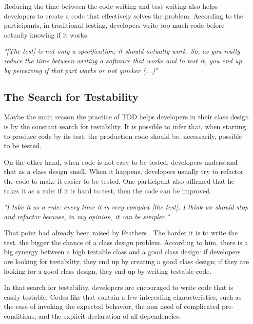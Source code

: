 \documentclass[times]{elsarticle}
\begin{document}
Reducing the time between the code writing and test writing also helps developers to
create a code that effectively solves the problem. According to the participants, in traditional
testing, developers write too much code before actually knowing if it works:

\begin{framed}
	\textit{"[The test] is not only a specification; it should actually work. So, as you really reduce
	the time between writing a software that works and to test it, you end up by perceiving if that
	part works or not quicker (...)"}
\end{framed}

\subsection{The Search for Testability}

Maybe the main reason the practice of TDD helps developers in their class design is
by the constant search for testability. It is possible to infer that,
when starting to produce code by its test, the production code should be, necessarily,
possible to be tested.

On the other hand, when code is not easy to be tested, developers understand that
as a class design smell. When it happens, developers usually try to refactor
the code to make it easier to be tested. One participant also affirmed that he
takes it as a rule: if it is hard to test, then the code can be improved.

\begin{framed}
	\textit{"I take it as a rule: every time it is very complex [the test],
	I think we should stop and refactor because, in my opinion, it can be simpler."}	
\end{framed}

That point had already been raised by Feathers \cite{feathers-synergy}.
The harder it is to write the test, the bigger the chance of a class design problem.
According to him, there is a big synergy between a high testable class and
a good class design: if developers are looking for testability, they end up by
creating a good class design; if they are looking for a good class design, they end
up by writing testable code.

In that search for testability, developers are encouraged to write code
that is easily testable. Codes like that contain a few interesting
characteristics, such as the ease of invoking the expected behavior,
the non need of complicated pre-conditions, and the explicit declaration
of all dependencies.
\end{document}

